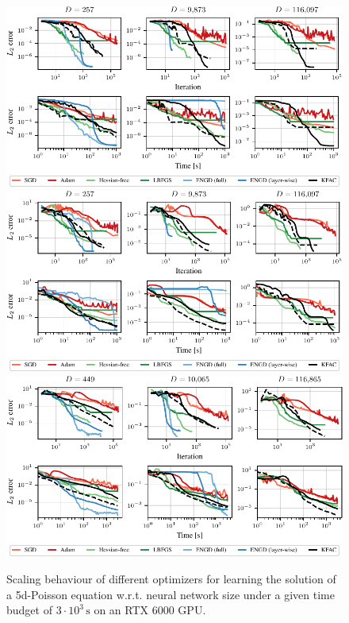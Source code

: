 \begin{figure}[tb]
  \centering
  \includegraphics{../kfac_pinns_exp/exp24_heat1d_groupplot/l2_error.pdf}
  \includegraphics{../kfac_pinns_exp/exp17_groupplot_poisson2d/l2_error.pdf}
  \includegraphics{../kfac_pinns_exp/exp18_groupplot_poisson5d/l2_error.pdf}
  \caption{Scaling behaviour of different optimizers for learning the solution of a 5d-Poisson equation w.r.t.
    neural network size under a given time budget of $3\cdot 10^3\,\text{s}$ on an RTX 6000 GPU.}
  \label{fig:pedagogical-example}
\end{figure}


